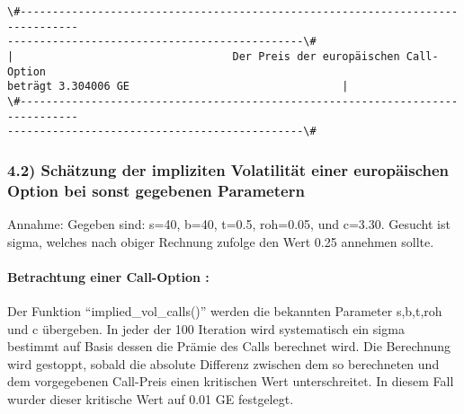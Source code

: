 \documentclass[paper=landscape]{scrartcl}
\begin{document}
    \begin{Verbatim}[commandchars=\\\{\}]
\#-------------------------------------------------------------------------------
----------------------------------------------\#
|                                  Der Preis der europäischen Call-Option
beträgt 3.304006 GE                                 |
\#-------------------------------------------------------------------------------
----------------------------------------------\#
    \end{Verbatim}

    \hypertarget{schuxe4tzung-der-impliziten-volatilituxe4t-einer-europuxe4ischen-option-bei-sonst-gegebenen-parametern}{%
\subsubsection{4.2) Schätzung der impliziten Volatilität einer
europäischen Option bei sonst gegebenen
Parametern}\label{schuxe4tzung-der-impliziten-volatilituxe4t-einer-europuxe4ischen-option-bei-sonst-gegebenen-parametern}}

Annahme: Gegeben sind: s=40, b=40, t=0.5, roh=0.05, und c=3.30. Gesucht
ist sigma, welches nach obiger Rechnung zufolge den Wert 0.25 annehmen
sollte.

\hypertarget{betrachtung-einer-call-option}{%
\paragraph{Betrachtung einer Call-Option
:}\label{betrachtung-einer-call-option}}

Der Funktion ``implied\_vol\_calls()'' werden die bekannten Parameter
s,b,t,roh und c übergeben. In jeder der 100 Iteration wird systematisch
ein sigma bestimmt auf Basis dessen die Prämie des Calls berechnet wird.
Die Berechnung wird gestoppt, sobald die absolute Differenz zwischen dem
so berechneten und dem vorgegebenen Call-Preis einen kritischen Wert
unterschreitet. In diesem Fall wurder dieser kritische Wert auf 0.01 GE
festgelegt.
\end{document}

